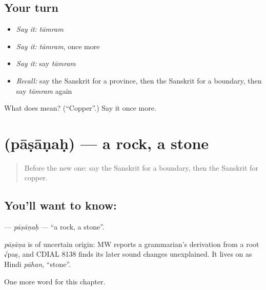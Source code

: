 \subsection*{Your turn}
\begin{itemize}
\raggedright
  \item \emph{Say it:} \emph{tāmram}
  \item \emph{Say it:} \emph{tāmram}, once more
  \item \emph{Say it:} say \emph{tāmram}
  \item \emph{Recall:} say the Sanskrit for a province, then the Sanskrit for a boundary, then say \emph{tāmram} again
\end{itemize}

\begin{tcolorbox}[breakable,colback=teal!4,colframe=teal!35!black,title={Before you move on}]
What does  mean? (\textquotedblleft{}Copper\textquotedblright{}.) Say it once more.
\end{tcolorbox}
\section[\texorpdfstring{\sk{पाषाणः} (pāṣāṇaḥ)}{पाषाणः (pāṣāṇaḥ)}]{ (pāṣāṇaḥ) — a rock, a stone}

\label{lesson:SA-C196-pasanah}



\begin{quote}
Before the new one: say the Sanskrit for a boundary, then the Sanskrit for copper.
\end{quote}

\subsection*{You'll want to know: }
\textbf{} — \emph{pāṣāṇaḥ} — \textquotedblleft{}a rock, a stone\textquotedblright{}.

\begin{cousinweb}
\emph{pāṣāṇa} is of uncertain origin: MW reports a grammarian's derivation from a root √paṣ, and CDIAL 8138 finds its later sound changes unexplained. It lives on as Hindi \emph{pāhan}, \textquotedblleft{}stone\textquotedblright{}.
\end{cousinweb}

\begin{grammarlens}[title={What you've built}]
One more word for this chapter.
\end{grammarlens}

